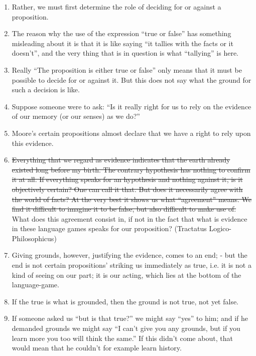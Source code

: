 \documentclass{book}
\begin{document}
\begin{enumerate}
\item
Rather, we must first determine the role of deciding for or against a
proposition.

\item
The reason why the use of the expression ``true or false'' has something
misleading about it is that it is like saying ``it tallies with the facts or it
doesn't'', and the very thing that is in question is what ``tallying'' is here.

\item
Really ``The proposition is either true or false'' only means that it must be
possible to decide for or against it. But this does not say what the ground for
such a decision is like.

\item
Suppose someone were to ask: ``Is it really right for us to rely on the
evidence of our memory (or our senses) as we do?''

\item
Moore's certain propositions almost declare that we have a right to rely upon
this evidence.

\item
\st{Everything that we regard as evidence indicates that the earth already existed
long before my birth. The contrary hypothesis has nothing to confirm it at all.
If everything speaks for an hypothesis and nothing against it, is it
objectively certain? One can call it that. But does it necessarily agree with
the world of facts? At the very best it shows us what ``agreement'' means. We
find it difficult to imagine it to be false, but also difficult to make use
of.} What does this agreement consist in, if not in the fact
that what is evidence in these language games speaks for our proposition?
(Tractatus Logico-Philosophicus)

\item
Giving grounds, however, justifying the evidence, comes to an end; - but the
end is not certain propositions' striking us immediately as true, i.e. it is
not a kind of seeing on our part; it is our acting, which lies at the bottom of
the language-game.

\item
If the true is what is grounded, then the ground is not true, not yet false.

\item
If someone asked us ``but is that true?'' we might say ``yes'' to him; and if
he demanded grounds we might say ``I can't give you any grounds, but if you
learn more you too will think the same.'' If this didn't come about, that would
mean that he couldn't for example learn history.


\end{enumerate}
\end{document}
